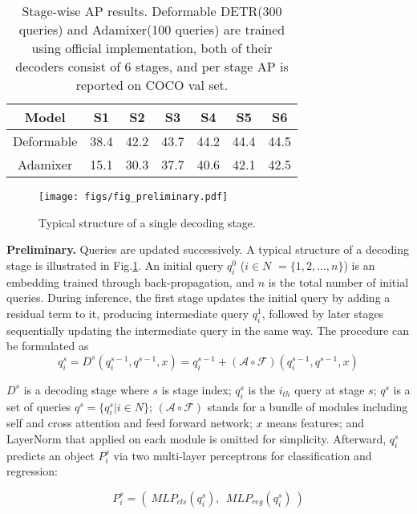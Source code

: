 \documentclass[10pt,twocolumn,letterpaper]{article}
\begin{document}
\begin{table}[]
    \centering
    \begin{tabular}{c|c|c|c|c|c|c}
        \toprule[1pt]
        Model & S1 & S2 & S3 & S4 & S5 & S6 \\ \midrule
        Deformable & 38.4 & 42.2 & 43.7 & 44.2 &44.4 & 44.5 \\ 
        Adamixer & 15.1  & 30.3 &37.7 &40.6&42.1&42.5 \\ 
        \bottomrule
    \end{tabular}
    \caption{Stage-wise AP results. Deformable DETR(300 queries) and Adamixer(100 queries) are trained using official implementation, both of their decoders consist of 6 stages, and per stage AP is reported on COCO val set.}
    \label{tab:stagewise_map}
\end{table}

\begin{figure}
    \centering
    \texttt{[image: figs/fig\_preliminary.pdf]}
    \caption{Typical structure of a single decoding stage.}
    \label{fig:preliminary}
\end{figure}

\textbf{Preliminary.} Queries are updated successively. A typical structure of a decoding stage is illustrated in Fig.\ref{fig:preliminary}. An initial query $q_i^0$ ($i\in N$ $=\{1,2,...,n\}$) is an embedding trained through back-propagation, and $n$ is the total number of initial queries. During inference, the first stage updates the initial query by adding a residual term to it, producing intermediate query $q_i^1$, followed by later stages sequentially updating the intermediate query in the same way. The procedure can be formulated as 
\begin{equation}
\label{eq:1}
    q_i^{s} = D^{s}(q_i^{s-1}, q^{s-1}, x)
    = q_i^{s-1} + (\mathcal{A}\circ\mathcal{F})(q_i^{s-1}, q^{s-1}, x)
\end{equation}

\noindent $D^s$ is a decoding stage where $s$ is stage index; $q_i^s$ is the $i_{th}$ query at stage $s$; $q^s$ is a set of queries $q^s=\{q_i^s|i\in N\}$; $(\mathcal{A}\circ\mathcal{F})$ stands for a bundle of modules including self and cross attention and feed forward network; $x$ means features; and LayerNorm \cite{Ba2016LayerN} that applied on each module is omitted for simplicity. Afterward, $q_i^s$ predicts an object $P_i^s$ via two multi-layer perceptrons for classification and regression: 

\begin{equation}
\label{eq:2}
    P_i^s = (~MLP_{cls}(q_i^s), ~~ MLP_{reg}(q_i^s)~)
\end{equation}
\end{document}
